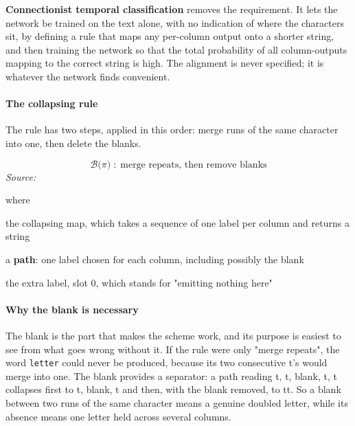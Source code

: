 \textbf{Connectionist temporal classification} \cite{graves2006} removes the requirement. It lets the network be trained on the text alone, with no indication of where the characters sit, by defining a rule that maps any per-column output onto a shorter string, and then training the network so that the total probability of all column-outputs mapping to the correct string is high. The alignment is never specified; it is whatever the network finds convenient.


\paragraph{The collapsing rule}
The rule has two steps, applied in this order: merge runs of the same character into one, then delete the blanks.


\begin{equation}
\mathcal{B}\big(\pi\big) \;:\; \text{merge repeats, then remove blanks}
\end{equation}
\noindent\emph{Source: }\cite{graves2006}


\noindent where
\begin{description}[leftmargin=2.4em,style=nextline,font=\normalfont\ttfamily]\setlength\itemsep{1pt}
  \item[{$\mathcal{B}$}] \normalfont the collapsing map, which takes a sequence of one label per column and returns a string
  \item[{$\pi$}] \normalfont a \textbf{path}: one label chosen for each column, including possibly the blank
  \item[{$\text{blank}$}] \normalfont the extra label, slot 0, which stands for "emitting nothing here"
\end{description}

\paragraph{Why the blank is necessary}
The blank is the part that makes the scheme work, and its purpose is easiest to see from what goes wrong without it. If the rule were only "merge repeats", the word \texttt{letter} could never be produced, because its two consecutive t's would merge into one. The blank provides a separator: a path reading t, t, blank, t, t collapses first to t, blank, t and then, with the blank removed, to tt. So a blank between two runs of the same character means a genuine doubled letter, while its absence means one letter held across several columns.


